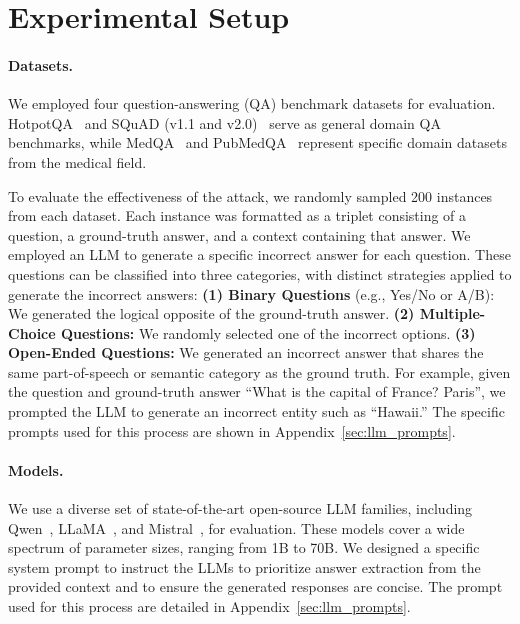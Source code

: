 
\section{Experimental Setup}

\paragraph{Datasets.} We employed four question-answering (QA) benchmark datasets for evaluation. HotpotQA~\cite{yang2018hotpotqa} and SQuAD (v1.1 and v2.0)~\cite{rajpurkar2016squad,rajpurkar2018know} serve as general domain QA benchmarks, while MedQA~\cite{jin2021disease} and PubMedQA~\cite{jin2019pubmedqa} represent specific domain datasets from the medical field.

To evaluate the effectiveness of the attack, we randomly sampled 200 instances from each dataset. Each instance was formatted as a triplet consisting of a question, a ground-truth answer, and a context containing that answer. 
% 
We employed an LLM to generate a specific incorrect answer for each question. These questions can be classified into three categories, with distinct strategies applied to generate the incorrect answers: \textbf{(1) Binary Questions} (e.g., Yes/No or A/B): We generated the logical opposite of the ground-truth answer. \textbf{(2) Multiple-Choice Questions:} We randomly selected one of the incorrect options. \textbf{(3) Open-Ended Questions:} We generated an incorrect answer that shares the same part-of-speech or semantic category as the ground truth. For example, given the question and ground-truth answer ``What is the capital of France? Paris'', we prompted the LLM to generate an incorrect entity such as ``Hawaii.'' 
% 
The specific prompts used for this process are shown in Appendix~\ref{sec:llm_prompts}.

\paragraph{Models.} 
We use a diverse set of state-of-the-art open-source LLM families, including Qwen~\cite{yang2025qwen3}, LLaMA~\cite{grattafiori2024llama}, and Mistral~\cite{mistral3_2025}, for evaluation. These models cover a wide spectrum of parameter sizes, ranging from 1B to 70B. 
% 
We designed a specific system prompt to instruct the LLMs to prioritize answer extraction from the provided context and to ensure the generated responses are concise. The prompt used for this process are detailed in Appendix~\ref{sec:llm_prompts}.

